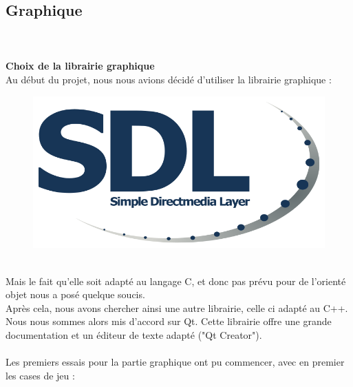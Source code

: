 \documentclass{article}
\begin{document}
\subsection{Graphique}
~\\~\\
\textbf{\large Choix de la librairie graphique}
~\\
Au début du projet, nous nous avions décidé d'utiliser la librairie graphique : 
~\\
\begin{figure}[!h]
\centering
\includegraphics[scale=0.2]{Images/logoSDL.png}
\end{figure}
~\\
Mais le fait qu'elle soit adapté au langage C, et donc pas prévu pour de l'orienté objet nous a posé quelque soucis.\\
Après cela, nous avons chercher ainsi une autre librairie, celle ci adapté au C++.\\
Nous nous sommes alors mis d'accord sur Qt. Cette librairie offre une grande documentation et un éditeur de texte adapté ("Qt Creator").
~\\~\\
Les premiers essais pour la partie graphique ont pu commencer, avec en premier les cases de jeu :
~\\~\\
\end{document}
